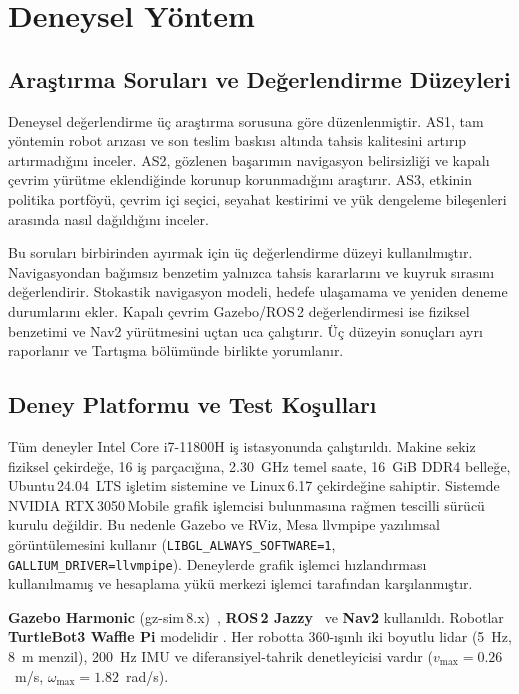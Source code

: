 \documentclass[10pt,letterpaper,onecolumn]{IEEEtran}
\begin{document}
\section{Deneysel Yöntem}
\label{sec:setup}

\subsection{Araştırma Soruları ve Değerlendirme Düzeyleri}
\label{sec:planes}

Deneysel değerlendirme üç araştırma sorusuna göre düzenlenmiştir. AS1, tam
yöntemin robot
arızası ve son teslim baskısı altında tahsis kalitesini artırıp artırmadığını
inceler. AS2, gözlenen başarımın navigasyon belirsizliği ve kapalı çevrim
yürütme eklendiğinde korunup korunmadığını araştırır. AS3, etkinin politika
portföyü, çevrim içi seçici, seyahat kestirimi ve yük dengeleme bileşenleri
arasında nasıl dağıldığını inceler.

Bu soruları birbirinden ayırmak için üç değerlendirme düzeyi kullanılmıştır.
Navigasyondan bağımsız benzetim yalnızca tahsis kararlarını ve kuyruk sırasını
değerlendirir. Stokastik navigasyon modeli, hedefe ulaşamama ve yeniden deneme
durumlarını ekler. Kapalı çevrim Gazebo/ROS\,2 değerlendirmesi ise fiziksel
benzetimi ve Nav2 yürütmesini uçtan uca çalıştırır. Üç düzeyin sonuçları ayrı
raporlanır ve Tartışma bölümünde birlikte yorumlanır.

\subsection{Deney Platformu ve Test Koşulları}
\label{sec:hardware}
Tüm deneyler Intel Core i7-11800H iş istasyonunda çalıştırıldı. Makine
sekiz fiziksel çekirdeğe, 16 iş parçacığına, 2.30~GHz temel saate, 16~GiB
DDR4 belleğe, Ubuntu\,24.04~LTS işletim sistemine ve Linux\,6.17 çekirdeğine
sahiptir. Sistemde NVIDIA RTX\,3050\,Mobile grafik işlemcisi bulunmasına rağmen
tescilli sürücü kurulu değildir. Bu nedenle Gazebo ve RViz, Mesa llvmpipe
yazılımsal görüntülemesini kullanır
(\nolinkurl{LIBGL_ALWAYS_SOFTWARE=1}, \nolinkurl{GALLIUM_DRIVER=llvmpipe}).
Deneylerde grafik işlemci hızlandırması kullanılmamış ve hesaplama yükü
merkezi işlemci tarafından karşılanmıştır.

\textbf{Gazebo Harmonic} (gz-sim\,8.x)~\cite{koenig2004design},
\textbf{ROS\,2 Jazzy}~\cite{macenski2022ros2} ve \textbf{Nav2}
\cite{macenski2023nav2} kullanıldı. Robotlar \textbf{TurtleBot3 Waffle Pi}
modelidir \cite{robotis2023turtlebot3}. Her robotta 360-ışınlı iki boyutlu
lidar (5~Hz, 8~m menzil), 200~Hz IMU ve diferansiyel-tahrik denetleyicisi
vardır ($v_{\max}{=}0.26$~m/s, $\omega_{\max}{=}1.82$~rad/s).
\end{document}
